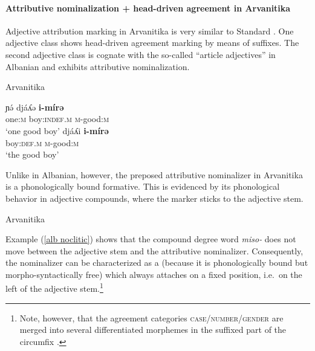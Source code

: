 \paragraph{Attributive nominalization + head-driven agreement in Arvanitika}
Adjective attribution marking in Arvanitika is very similar to Standard . One adjective class shows head-driven agreement marking by means of suffixes. The second adjective class is cognate with the so-called “article adjectives” in Albanian and exhibits attributive nominalization. 
\begin{exe}
\ex \rm{Arvanitika \citep[303]{sasse1991}}
\begin{xlist}
\ex
\gll	ɲə́ 			djáʎə 			\textbf{i-mírə}\\
	one:\textsc{m} 	boy:\textsc{indef.m} 	\textsc{m}-good:\textsc{m}\\
\glt	‘one good boy’
\ex
\gll				djáʎi 				\textbf{i-mírə}\\
				boy:\textsc{def.m} 	\textsc{m}-good:\textsc{m}\\
\glt	‘the good boy’
\end{xlist}
\end{exe}
Unlike in Albanian, however, the preposed attributive nominalizer in Arvanitika is a phonologically bound formative. This is evidenced by its phonological behavior in adjective compounds, where the marker sticks to the adjective stem.
\begin{exe}
\label{alb noclitic}
\ex \rm{Arvanitika \citep[304]{sasse1991}}
\begin{xlist}
\end{xlist}
\end{exe}
Example (\ref{alb noclitic}) shows that the compound degree word {\it miso-} does not move between the adjective stem and the attributive nominalizer. Consequently, the nominalizer can be characterized as a  (because it is phonologically bound but morpho-syntactically free) which always attaches on a fixed position, i.e.~on the left of the adjective stem.\footnote{Note, however, that the agreement categories \textsc{case/number/gender} are merged into several differentiated morphemes in the suffixed part of the circumfix \cite[124–128]{sasse1991}.}

